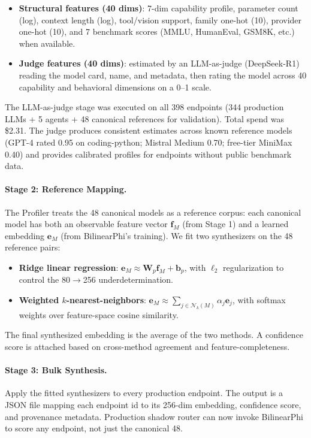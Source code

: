 \begin{itemize}
    \item \textbf{Structural features (40 dims)}: 7-dim capability profile, parameter count (log), context length (log), tool/vision support, family one-hot (10), provider one-hot (10), and 7 benchmark scores (MMLU, HumanEval, GSM8K, etc.) when available.
    \item \textbf{Judge features (40 dims)}: estimated by an LLM-as-judge (DeepSeek-R1) reading the model card, name, and metadata, then rating the model across 40 capability and behavioral dimensions on a 0--1 scale.
\end{itemize}

The LLM-as-judge stage was executed on all 398 endpoints (344 production LLMs + 5 agents + 48 canonical references for validation). Total spend was \$2.31. The judge produces consistent estimates across known reference models (GPT-4 rated 0.95 on coding-python; Mistral Medium 0.70; free-tier MiniMax 0.40) and provides calibrated profiles for endpoints without public benchmark data.

\paragraph{Stage 2: Reference Mapping.} The Profiler treats the 48 canonical models as a reference corpus: each canonical model has both an observable feature vector $\mathbf{f}_M$ (from Stage 1) and a learned embedding $\mathbf{e}_M$ (from BilinearPhi's training). We fit two synthesizers on the 48 reference pairs:
\begin{itemize}
    \item \textbf{Ridge linear regression}: $\mathbf{e}_M \approx \mathbf{W}_p \mathbf{f}_M + \mathbf{b}_p$, with $\ell_2$ regularization to control the 80$\to$256 underdetermination.
    \item \textbf{Weighted $k$-nearest-neighbors}: $\mathbf{e}_M \approx \sum_{j \in \mathcal{N}_k(M)} \alpha_j \mathbf{e}_j$, with softmax weights over feature-space cosine similarity.
\end{itemize}
The final synthesized embedding is the average of the two methods. A confidence score is attached based on cross-method agreement and feature-completeness.

\paragraph{Stage 3: Bulk Synthesis.} Apply the fitted synthesizers to every production endpoint. The output is a JSON file mapping each endpoint id to its 256-dim embedding, confidence score, and provenance metadata. Production shadow router can now invoke BilinearPhi to score any endpoint, not just the canonical 48.

